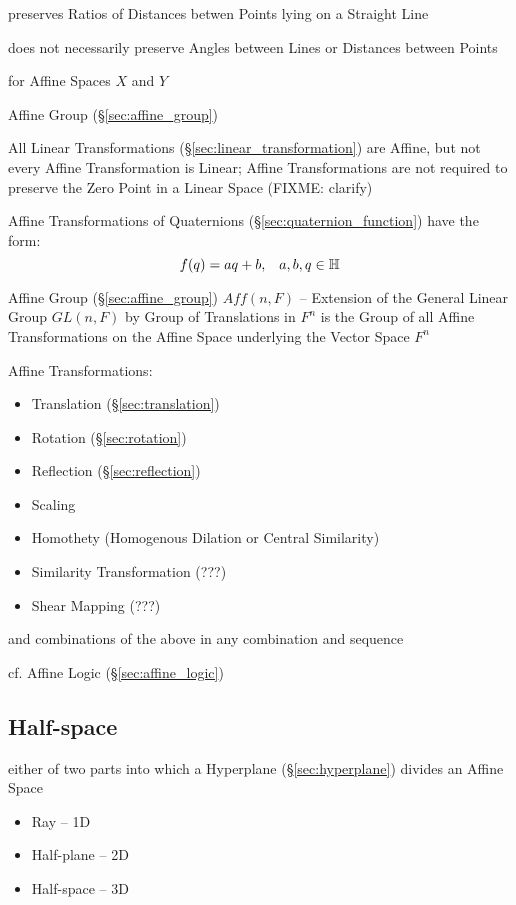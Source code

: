 preserves Ratios of Distances betwen Points lying on a Straight Line

does not necessarily preserve Angles between Lines or Distances
between Points

for Affine Spaces $X$ and $Y$

\fist Affine Group (\S\ref{sec:affine_group})

\fist All Linear Transformations (\S\ref{sec:linear_transformation}) are
Affine, but not every Affine Transformation is Linear; Affine Transformations
are not required to preserve the Zero Point in a Linear Space (FIXME: clarify)

Affine Transformations of Quaternions (\S\ref{sec:quaternion_function}) have
the form:
\[
  f(q) = aq + b, \;\;\; a,b,q \in \mathbb{H}
\]

Affine Group (\S\ref{sec:affine_group}) $Aff(n,F)$ -- Extension of the General
Linear Group $GL(n,F)$ by Group of Translations in $F^n$ is the Group of all
Affine Transformations on the Affine Space underlying the Vector Space $F^n$

Affine Transformations:
\begin{itemize}
\item Translation (\S\ref{sec:translation})
\item Rotation (\S\ref{sec:rotation})
\item Reflection (\S\ref{sec:reflection})
\item Scaling
\item Homothety (Homogenous Dilation or Central Similarity)
\item Similarity Transformation (???)
\item Shear Mapping (???)
\end{itemize}
and combinations of the above in any combination and sequence

cf. Affine Logic (\S\ref{sec:affine_logic})



\subsection{Half-space}\label{sec:halfspace}

either of two parts into which a Hyperplane (\S\ref{sec:hyperplane}) divides an
Affine Space

\begin{itemize}
  \item Ray -- 1D
  \item Half-plane -- 2D
  \item Half-space -- 3D
\end{itemize}




